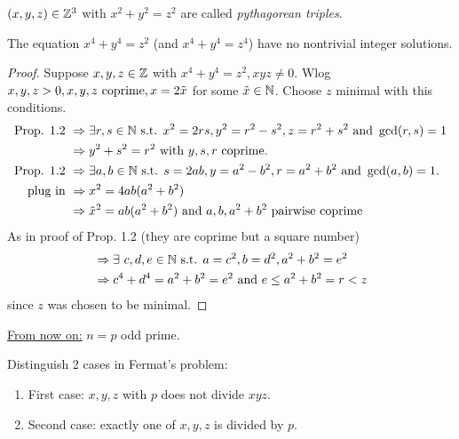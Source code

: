 \begin{Bem*}
$(x,y,z) \in \mathbb{Z}^3$ with $x^2+y^2=z^2$ are called \emph{pythagorean triples}.
\end{Bem*}


\begin{Prop}[$n=4$]
The equation $x^4+y^4=z^2$ (and $x^4+y^4=z^4$) have no nontrivial integer solutions.
\end{Prop}

\begin{proof}
Suppose $x,y,z \in \mathbb{Z}$ with $x^4+y^4=z^2, xyz \not = 0$. Wlog $x,y,z > 0, x,y,z \text{ coprime},\linebreak
x=2\tilde{x}$ for some $\tilde{x} \in \mathbb{N}$. Choose $z$ minimal with this conditions.
\begin{align*}
\text{Prop. 1.2 } &\Rightarrow \exists r,s \in \mathbb{N} \text{ s.t. } x^2=2rs,y^2=r^2-s^2, z=r^2+s^2 \text{ and } \gcd(r,s)=1\\
&\Rightarrow y^2+s^2=r^2\text{ with }y,s,r \text{ coprime.}\\
\text{Prop. 1.2 } &\Rightarrow \exists a,b \in \mathbb{N} \text{ s.t. } s=2ab, y=a^2-b^2, r=a^2+b^2 \text{ and } \gcd(a,b)=1.\\
\text{plug in } &\Rightarrow x^2=4ab(a^2+b^2)\\
&\Rightarrow \tilde{x}^2=ab(a^2+b^2) \text{ and } a,b,a^2+b^2 \text{ pairwise coprime}
\end{align*}
As in proof of Prop. 1.2 (they are coprime but a square number)
\begin{align*}
&\Rightarrow \exists\ c,d,e \in \mathbb{N} \text{ s.t. } a=c^2, b=d^2, a^2+b^2=e^2\\
&\Rightarrow c^4+d^4=a^2+b^2=e^2 \text{ and } e \leq a^2+b^2 = r < z
\end{align*}
\Lightning since $z$ was chosen to be minimal.
\end{proof}

\underline{From now on:} $n=p$ odd prime.

\begin{idea}[by Germain]
Distinguish 2 cases in Fermat's problem:
\begin{enumerate}
\item \glqq First case\grqq : $x,y,z$ with $p$ does not divide $xyz$.
\item \glqq Second case\grqq : exactly one of $x,y,z$ is divided by $p$.
\end{enumerate}
\end{idea}

